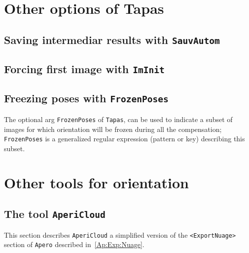 
\section{Other options of Tapas}

\subsection{Saving intermediar results with {\tt SauvAutom}}

\subsection{Forcing first image with {\tt ImInit}}

\subsection{Freezing poses with  {\tt FrozenPoses}}

The optional arg {\tt FrozenPoses} of {\tt Tapas}, can be used to indicate
a subset of images for which orientation will be frozen during all the
compensation;  {\tt FrozenPoses} is a generalized regular expression
(pattern or key) describing this subset.




\section{Other tools for orientation}



\subsection{The tool {\tt AperiCloud}}
\label{APERICLOUD}

This section describes {\tt AperiCloud} a simplified version of the
{\tt <ExportNuage>} section of {\tt Apero} described in~\ref{Ap:Exp:Nuage}.



